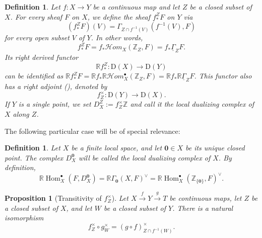 \documentclass[amssymb,amscd,11pt,20pt]{amsart}
\newcommand{\ZZ}{{\mathbb Z}}
\newcommand{\RR}{\mathbb R}
\newcommand{\0}{\mathbf 0}
\DeclareMathOperator{\Hom}{{Hom}}
\newcommand{\pun}{{\scriptscriptstyle \bullet}}
\newcommand{\HHom}{\mathcal{H}om}
\theoremstyle{plain}
\newtheorem{prop}[thm]{Proposition}
\newtheorem{defn}[thm]{Definition}
\numberwithin{equation}{thm}
\begin{document}
\begin{defn}{\rm  Let $f\colon X\to Y$ be a continuous map and let $Z$ be a closed subset of $X$. For every sheaf $F$ on $X$, we define the sheaf $f_*^ZF$ on $Y$ via
\[ (f_*^ZF)(V)=\Gamma_{Z\cap f^{-1}(V)}(f^{-1}(V),F)\] for every open subset $V$ of $Y$. In other words,
\[ f_*^ZF=f_*\HHom_X(\ZZ_Z,F)=f_*{\underline\Gamma}_ZF.\] Its right derived functor
\[ \RR f_*^Z\colon \mathrm{D}(X)\to \mathrm{D}(Y) \] can be identified as $\RR f_*^ZF=\RR f_* \RR\HHom_X^\pun(\ZZ_Z,F)=\RR f_*\RR {\underline\Gamma}_ZF$. This functor also has a right adjoint (\cite{ST2}),  denoted by
\[ f^\times_Z\colon \mathrm{D}(Y)\to \mathrm{D}(X).\] If $Y$ is a single point, we set $D_X^Z:=f^\times_Z\ZZ$ and call it the \emph{local dualizing complex of $X$ along $Z$}.}
\end{defn}

The following particular case will be of special relevance:
\begin{defn}\label{deflocaldualizing}{\rm Let $X$ be a finite local space, and let $\mathbf{0} \in X$ be its unique closed point. The complex $D_X^\0$ will be called {\em the local dualizing complex of $X$}. By definition,
\[\RR\Hom_X^\pun(F,D_X^\0)= \RR\Gamma_\0(X,F)^\vee=\RR\Hom_X^\pun(\ZZ_{\{\0\}},F)^\vee.\]
}
\end{defn} 

\begin{prop}[Transitivity of $f^\times_Z$]\label{transitivity} Let $  X\overset f\to Y\overset g\to T$ be continuous maps, let $Z$ be a closed subset of $X$, and let $W$ be a closed subset of $Y$. There is a natural isomorphism
\[ f_Z^\times\circ g_W^\times = (g\circ f)_{Z\cap f^{-1}(W)}^\times.\]
\end{prop}
\end{document}

